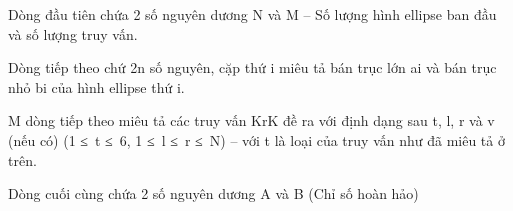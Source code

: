 Dòng đầu tiên chứa 2 số nguyên dương N và M – Số lượng hình ellipse ban đầu và số lượng truy vấn.  

   Dòng tiếp theo chứ 2n số nguyên, cặp thứ i miêu tả bán trục lớn ai và bán trục nhỏ bi của hình ellipse thứ i.  

   M dòng tiếp theo miêu tả các truy vấn KrK đề ra với định dạng sau t, l, r và v (nếu có) (1 ≤ t ≤ 6, 1 ≤ l ≤ r ≤ N) – với t là loại của truy vấn như đã miêu tả ở trên.  

   Dòng cuối cùng chứa 2 số nguyên dương A và B (Chỉ số hoàn hảo)